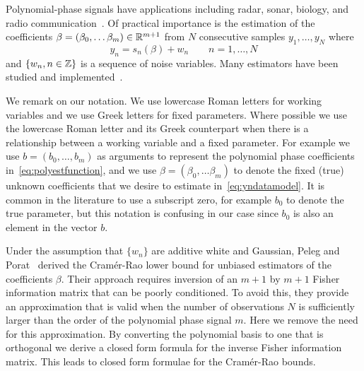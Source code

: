 \documentclass[review]{elsarticle}
\begin{document}
Polynomial-phase signals have applications including radar, sonar, biology, and radio communication~\cite{Angeby_estimating_2000,Levanon_Radar_signals_2004}.  %
Of practical importance is the estimation of the coefficients $\beta = (\beta_0, \dots \beta_m)\in{\mathbb R}^{m+1}$ from $N$ consecutive samples $y_1, \dots, y_N$ where 
\begin{equation}\label{eq:yndatamodel}
y_n = s_n(\beta) + w_n \qquad n = 1,\dots, N
\end{equation}
and $\{w_n, n \in {\mathbb Z}\}$ is a sequence of noise variables.  Many estimators have been studied and implemented~\cite{Angeby_estimating_2000,Oshea_cpf_2004,Morelande_bayes_unwrapping_2009_tsp,Kitchen_polyphase_unwrapping_1994,Peleg_DPT_1995, Djuric_phase_unwrap_chirp_1990}.  

We remark on our notation.  We use lowercase Roman letters for working variables and we use Greek letters for fixed parameters.  Where possible we use the lowercase Roman letter and its Greek counterpart when there is a relationship between a working variable and a fixed parameter.  For example we use $b=(b_0,\dots,b_m)$ as arguments to represent the polynomial phase coefficients in~\eqref{eq:polyestfunction}, and we use $\beta = (\beta_0, \dots \beta_m)$ to denote the fixed (true) unknown coefficients that we desire to estimate in~\eqref{eq:yndatamodel}.  It is common in the literature to use a subscript zero, for example $b_0$ to denote the true parameter, but this notation is confusing in our case since $b_0$ is also an element in the vector $b$.

Under the assumption that $\{w_n\}$ are additive white and Gaussian, Peleg and Porat~\cite{Peleg1991_CRB_PPS_1991} derived the Cram\'{e}r-Rao lower bound for unbiased estimators of the coefficients $\beta$.  Their approach requires inversion of an $m+1$ by $m+1$ Fisher information matrix that can be poorly conditioned.  To avoid this, they provide an approximation that is valid when the number of observations $N$ is sufficiently larger than the order of the polynomial phase signal $m$.  Here we remove the need for this approximation.  By converting the polynomial basis to one that is orthogonal we derive a closed form formula for the inverse Fisher information matrix.  This leads to closed form formulae for the Cram\'{e}r-Rao bounds.  %
\end{document}

